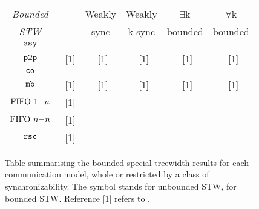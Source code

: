 \newcommand{\cmark}{\ding{51}}%
\newcommand{\xmark}{\ding{55}}%
\begin{figure}[ht]
		\begin{tabular}{|c || c | c | c|  c| c| }
			\hline
			\emph{Bounded} &  & Weakly  & Weakly  & $\exists$k & $\forall$k  \\
			\emph{STW} & & sync & k-sync & bounded & bounded \\
			\hline \hline
			$\mathtt{asy}$ & \ding{55} & \xmark & \cmark & \cmark & \cmark \\
			\hline
			$\mathtt{p2p}$ & \xmark~[1] & \xmark~[1] & \cmark~[1] & \cmark~[1] & \cmark~[1] \\
			\hline
			$\mathtt{co}$ & \xmark & \xmark & \cmark & \cmark & \cmark \\
			\hline
			$\mathtt{mb}$& \xmark~[1] & \cmark~[1] & \cmark~[1] & \cmark~[1] & \cmark~[1] \\
			\hline
			$\text{FIFO } 1\mathsf{-}n$ & \xmark~[1] & \cmark & \cmark & \cmark & \cmark \\
			\hline
			$\text{FIFO } n\mathsf{-}n$ & \xmark~[1] & \cmark & \cmark & \cmark & \cmark \\
			\hline
			$\mathtt{rsc}$ & \cmark~[1] & \cmark & \cmark & \cmark & \cmark \\
			\hline
		\end{tabular}
		\caption{Table summarising the bounded special treewidth results for each communication model, whole or restricted by a class of synchronizability. The symbol \xmark\;stands for unbounded STW, \cmark\;for bounded STW. Reference [1] refers to \cite{BolligFG21}.}
		\label{fig:stw-bound}
\end{figure}
